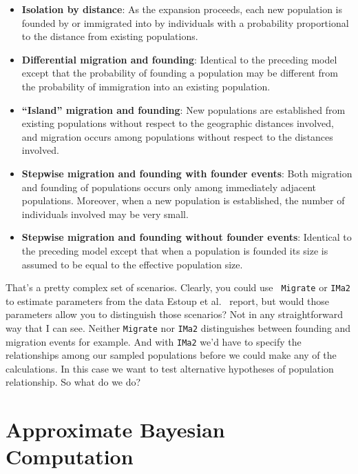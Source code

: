 \documentclass[12pt]{article}
\begin{document}
\begin{itemize}

\item {\bf Isolation by distance}: As the expansion proceeds, each new
  population is founded by or immigrated into by individuals with a
  probability proportional to the distance from existing populations.

\item {\bf Differential migration and founding}: Identical to the
  preceding model except that the probability of founding a population
  may be different from the probability of immigration into an
  existing population.

\item {\bf ``Island'' migration and founding}: New populations are
  established from existing populations without respect to the
  geographic distances involved, and migration occurs among
  populations without respect to the distances involved.

\item {\bf Stepwise migration and founding with founder events}: Both
  migration and founding of populations occurs only among immediately
  adjacent populations. Moreover, when a new population is
  established, the number of individuals involved may be very small.

\item {\bf Stepwise migration and founding without founder events}:
  Identical to the preceding model except that when a population is
  founded its size is assumed to be equal to the effective population
  size. 

\end{itemize}

That's a pretty complex set of scenarios. Clearly, you could use {\tt
  Migrate} or {\tt IMa2} to estimate parameters from the data Estoup
et al.~\cite{Estoup-etal-2004} report, but would those parameters
allow you to distinguish those scenarios? Not in any straightforward
way that I can see. Neither {\tt Migrate} nor {\tt IMa2} distinguishes
between founding and migration events for example. And with {\tt IMa2}
we'd have to specify the relationships among our sampled populations
before we could make any of the calculations. In this case we want to
test alternative hypotheses of population relationship. So what do we
do?

\section*{Approximate Bayesian Computation}
\end{document}
